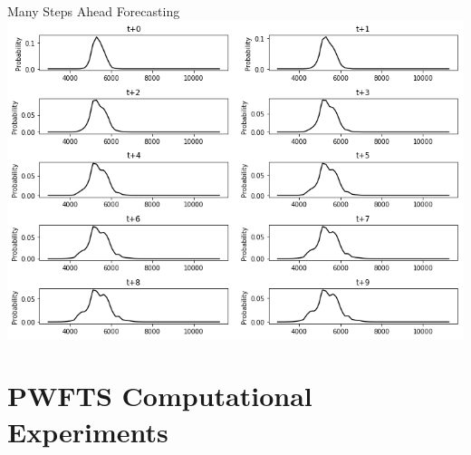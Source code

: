 \documentclass{beamer}
\begin{document}
\begin{frame}{Many Steps Ahead Forecasting}
\includegraphics[width=\textwidth]{figures/pwfts_sample_manystep_tiled.png}
\end{frame}

\section{PWFTS Computational Experiments}
\end{document}

